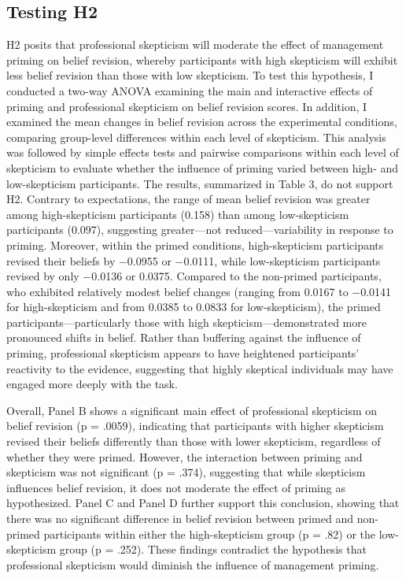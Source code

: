 \documentclass[12pt,english]{article}
\begin{document}
\subsection{Testing H2}
H2 posits that professional skepticism will moderate the effect of management priming on belief revision, whereby participants with high skepticism will exhibit less belief revision than those with low skepticism. To test this hypothesis, I conducted a two-way ANOVA examining the main and interactive effects of priming and professional skepticism on belief revision scores. In addition, I examined the mean changes in belief revision across the experimental conditions, comparing group-level differences within each level of skepticism. This analysis was followed by simple effects tests and pairwise comparisons within each level of skepticism to evaluate whether the influence of priming varied between high- and low-skepticism participants. The results, summarized in Table 3, do not support H2. Contrary to expectations, the range of mean belief revision was greater among high-skepticism participants (0.158) than among low-skepticism participants (0.097), suggesting greater—not reduced—variability in response to priming. Moreover, within the primed conditions, high-skepticism participants revised their beliefs by −0.0955 or −0.0111, while low-skepticism participants revised by only −0.0136 or 0.0375. Compared to the non-primed participants, who exhibited relatively modest belief changes (ranging from 0.0167 to −0.0141 for high-skepticism and from 0.0385 to 0.0833 for low-skepticism), the primed participants—particularly those with high skepticism—demonstrated more pronounced shifts in belief. Rather than buffering against the influence of priming, professional skepticism appears to have heightened participants' reactivity to the evidence, suggesting that highly skeptical individuals may have engaged more deeply with the task. 

Overall, Panel B shows a significant main effect of professional skepticism on belief revision (p = .0059), indicating that participants with higher skepticism revised their beliefs differently than those with lower skepticism, regardless of whether they were primed. However, the interaction between priming and skepticism was not significant (p = .374), suggesting that while skepticism influences belief revision, it does not moderate the effect of priming as hypothesized. Panel C and Panel D further support this conclusion, showing that there was no significant difference in belief revision between primed and non-primed participants within either the high-skepticism group (p = .82) or the low-skepticism group (p = .252). These findings contradict the hypothesis that professional skepticism would diminish the influence of management priming.
\end{document}
